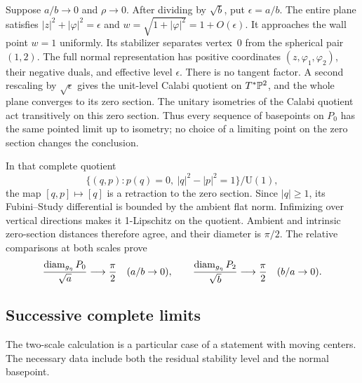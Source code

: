 Suppose $a/b\to0$ and $\rho\to0$. After dividing
by $\sqrt b$, put $\epsilon=a/b$. The entire
plane satisfies
$|z|^2+|\varphi|^2=\epsilon$ and
$w=\sqrt{1+|\varphi|^2}=1+O(\epsilon)$.
It approaches the wall point $w=1$ uniformly.
Its stabilizer separates vertex~0 from the
spherical pair $(1,2)$. The full normal
representation has positive coordinates
$(z,\varphi_1,\varphi_2)$, their negative
duals, and effective level $\epsilon$.
There is no tangent factor. A second rescaling
by $\sqrt\epsilon$ gives the unit-level
Calabi quotient on $T^*\mathbb P^2$, and the whole
plane converges to its zero section.
The unitary isometries of the Calabi quotient act transitively
on this zero section. Thus every sequence of basepoints on
$P_0$ has the same pointed limit up to isometry; no choice
of a limiting point on the zero section changes the conclusion.

In that complete quotient
\[
 \{(q,p):p(q)=0,\ |q|^2-|p|^2=1\}/\mathrm U(1),
\]
the map $[q,p]\mapsto[q]$ is a retraction to
the zero section. Since $|q|\ge1$, its
Fubini--Study differential is bounded by the
ambient flat norm. Infimizing over vertical
directions makes it 1-Lipschitz on the
quotient. Ambient and intrinsic zero-section
distances therefore agree, and their diameter
is $\pi/2$. The relative comparisons at both
scales prove
\begin{equation}\label{eq:separated-diameter}
 \frac{\operatorname{diam}_{g_\eta}P_0}{\sqrt a}\longrightarrow\frac\pi2
       \quad(a/b\to0),
 \qquad
 \frac{\operatorname{diam}_{g_\eta}P_2}{\sqrt b}\longrightarrow\frac\pi2
       \quad(b/a\to0).
\end{equation}

\subsection{Successive complete limits}
The two-scale calculation is a particular case
of a statement with moving centers. The necessary
data include both the residual stability level
and the normal basepoint.

